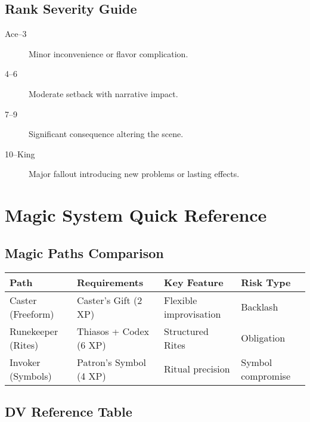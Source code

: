 \subsection{Rank Severity Guide}
\label{subsec:rank-severity}

\begin{description}
\item[Ace--3] Minor inconvenience or flavor complication.
\item[4--6] Moderate setback with narrative impact.
\item[7--9] Significant consequence altering the scene.
\item[10--King] Major fallout introducing new problems or lasting effects.
\end{description}

\section{Magic System Quick Reference}
\label{sec:magic-reference}

\subsection{Magic Paths Comparison}
\label{subsec:magic-paths-ref}

\begin{center}
\feTableStart
\begin{tabularx}{\linewidth}{@{}l l l l @{}}
\toprule
\textbf{Path} & \textbf{Requirements} & \textbf{Key Feature} & \textbf{Risk Type} \\
\midrule
Caster (Freeform) & Caster's Gift (2 XP) & Flexible improvisation & Backlash \\
Runekeeper (Rites) & Thiasos + Codex (6 XP) & Structured Rites & Obligation \\
Invoker (Symbols) & Patron's Symbol (4 XP) & Ritual precision & Symbol compromise \\
\bottomrule
\end{tabularx}
\feTableEnd
\end{center}

\subsection*{DV Reference Table}
\label{tab:dv-reference}

